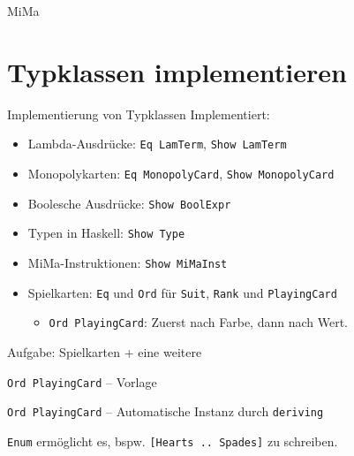 \documentclass{beamer}
\begin{document}
\begin{frame}{MiMa}
\end{frame}

\section{Typklassen implementieren}

\begin{frame}{Implementierung von Typklassen}
  Implementiert:

  \vfill

  \begin{itemize}
    \item Lambda-Ausdrücke: \texttt{Eq LamTerm}, \texttt{Show LamTerm}
    \item Monopolykarten: \texttt{Eq MonopolyCard}, \texttt{Show MonopolyCard}
    \item Boolesche Ausdrücke: \texttt{Show BoolExpr}
    \item Typen in Haskell: \texttt{Show Type}
    \item MiMa-Instruktionen: \texttt{Show MiMaInst}
    \item Spielkarten: \texttt{Eq} und \texttt{Ord} für \texttt{Suit}, \texttt{Rank} und \texttt{PlayingCard}
    \begin{itemize}
      \item \texttt{Ord PlayingCard}: Zuerst nach Farbe, dann nach Wert.
    \end{itemize}
  \end{itemize}

  \vfill
  
  Aufgabe: Spielkarten + eine weitere
\end{frame}

\begin{frame}{\texttt{Ord PlayingCard} -- Vorlage}
\end{frame}

\begin{frame}{\texttt{Ord PlayingCard} -- Automatische Instanz durch \texttt{deriving}}

  \texttt{Enum} ermöglicht es, bspw. \texttt{[Hearts .. Spades]} zu schreiben.
\end{frame}
\end{document}
